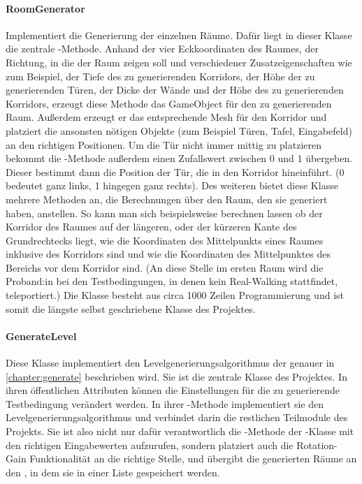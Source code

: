 \begin{multicols*}{2}
    \paragraph{RoomGenerator}
    Implementiert die Generierung der einzelnen Räume. Dafür liegt in dieser Klasse die zentrale -Methode. Anhand der vier Eckkoordinaten des Raumes, der Richtung, in die der Raum zeigen soll und verschiedener Zusatzeigenschaften wie zum Beispiel, der Tiefe des zu generierenden Korridors, der Höhe der zu generierenden Türen, der Dicke der Wände und der Höhe des zu generierenden Korridors, erzeugt diese Methode das GameObject für den zu generierenden Raum. Außerdem erzeugt er das entsprechende Mesh für den Korridor und platziert die ansonsten nötigen Objekte (zum Beispiel Türen, Tafel, Eingabefeld) an den richtigen Positionen. Um die Tür nicht immer mittig zu platzieren bekommt die -Methode außerdem einen Zufallswert zwischen 0 und 1 übergeben. Dieser bestimmt dann die Position der Tür, die in den Korridor hineinführt. (0 bedeutet ganz links, 1 hingegen ganz rechts).
    Des weiteren bietet diese Klasse mehrere Methoden an, die Berechnungen über den Raum, den sie generiert haben, anstellen. So kann man sich beispielsweise berechnen lassen ob der Korridor des Raumes auf der längeren, oder der kürzeren Kante des Grundrechtecks liegt, wie die Koordinaten des Mittelpunkts eines Raumes inklusive des Korridors sind und wie die Koordinaten des Mittelpunktes des Bereichs vor dem Korridor sind. (An diese Stelle im ersten Raum wird die Proband:in bei den Testbedingungen, in denen kein Real-Walking stattfindet, teleportiert.) Die Klasse besteht aus circa 1000 Zeilen Programmierung und ist somit die längste selbst geschriebene Klasse des Projektes.

    \paragraph{GenerateLevel}
    Diese Klasse implementiert den Levelgenerierungsalgorithmus der genauer in \autoref{chapter:generate}
    beschrieben wird. Sie ist die zentrale Klasse des Projektes. In ihren öffentlichen Attributen können die Einstellungen für die zu generierende Testbedingung verändert werden. In ihrer -Methode implementiert sie den Levelgenerierungsalgorithmus und verbindet darin die restlichen Teilmodule des Projekts. Sie ist also nicht nur dafür verantwortlich die -Methode der -Klasse mit den richtigen Eingabewerten aufzurufen, sondern platziert auch die Rotation-Gain Funktionalität an die richtige Stelle, und übergibt die generierten Räume an den , in dem sie in einer Liste gespeichert werden.


\end{multicols*}
